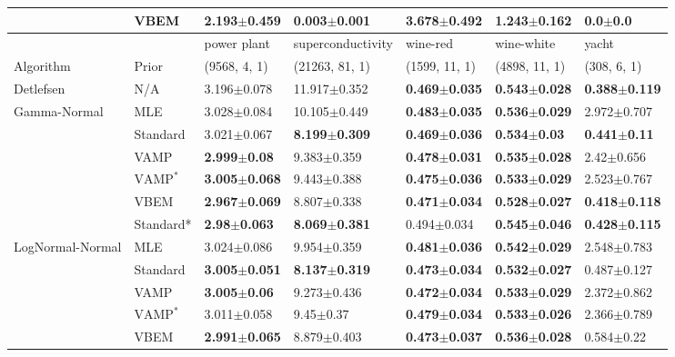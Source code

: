 \begin{tabular}{lllllll}
                 & VBEM &  \textbf{2.193$\pm$0.459} &  \textbf{0.003$\pm$0.001} &           3.678$\pm$0.492 &           1.243$\pm$0.162 &           0.0$\pm$0.0 \\
\midrule
                 &      &               power plant &         superconductivity &                  wine-red &                wine-white &                     yacht \\
Algorithm & Prior& (9568, 4, 1)& (21263, 81, 1)& (1599, 11, 1)& (4898, 11, 1)& (308, 6, 1)\\
\midrule
Detlefsen & N/A &           3.196$\pm$0.078 &          11.917$\pm$0.352 &  \textbf{0.469$\pm$0.035} &  \textbf{0.543$\pm$0.028} &  \textbf{0.388$\pm$0.119} \\
Gamma-Normal & MLE &           3.028$\pm$0.084 &          10.105$\pm$0.449 &  \textbf{0.483$\pm$0.035} &  \textbf{0.536$\pm$0.029} &           2.972$\pm$0.707 \\
                 & Standard &           3.021$\pm$0.067 &  \textbf{8.199$\pm$0.309} &  \textbf{0.469$\pm$0.036} &   \textbf{0.534$\pm$0.03} &   \textbf{0.441$\pm$0.11} \\
                 & VAMP &   \textbf{2.999$\pm$0.08} &           9.383$\pm$0.359 &  \textbf{0.478$\pm$0.031} &  \textbf{0.535$\pm$0.028} &            2.42$\pm$0.656 \\
                 & $\text{VAMP}^*$ &  \textbf{3.005$\pm$0.068} &           9.443$\pm$0.388 &  \textbf{0.475$\pm$0.036} &  \textbf{0.533$\pm$0.029} &           2.523$\pm$0.767 \\
                 & VBEM &  \textbf{2.967$\pm$0.069} &           8.807$\pm$0.338 &  \textbf{0.471$\pm$0.034} &  \textbf{0.528$\pm$0.027} &  \textbf{0.418$\pm$0.118} \\
                 & Standard* &   \textbf{2.98$\pm$0.063} &  \textbf{8.069$\pm$0.381} &           0.494$\pm$0.034 &  \textbf{0.545$\pm$0.046} &  \textbf{0.428$\pm$0.115} \\
LogNormal-Normal & MLE &           3.024$\pm$0.086 &           9.954$\pm$0.359 &  \textbf{0.481$\pm$0.036} &  \textbf{0.542$\pm$0.029} &           2.548$\pm$0.783 \\
                 & Standard &  \textbf{3.005$\pm$0.051} &  \textbf{8.137$\pm$0.319} &  \textbf{0.473$\pm$0.034} &  \textbf{0.532$\pm$0.027} &           0.487$\pm$0.127 \\
                 & VAMP &   \textbf{3.005$\pm$0.06} &           9.273$\pm$0.436 &  \textbf{0.472$\pm$0.034} &  \textbf{0.533$\pm$0.029} &           2.372$\pm$0.862 \\
                 & $\text{VAMP}^*$ &           3.011$\pm$0.058 &             9.45$\pm$0.37 &  \textbf{0.479$\pm$0.034} &  \textbf{0.533$\pm$0.026} &           2.366$\pm$0.789 \\
                 & VBEM &  \textbf{2.991$\pm$0.065} &           8.879$\pm$0.403 &  \textbf{0.473$\pm$0.037} &  \textbf{0.536$\pm$0.028} &            0.584$\pm$0.22 \\
\bottomrule
\end{tabular}

